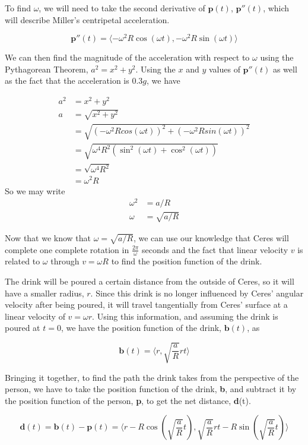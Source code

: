 \documentclass{amsart}
\renewcommand{\vec}{\textbf}
\theoremstyle{definition}
\begin{document}
To find $\omega$, we will need to take the second derivative of $\vec{p}(t)$, $\vec{p}''(t)$, which will describe Miller's centripetal acceleration.

\[
\vec{p}''(t) = \langle -\omega^2 R \cos(\omega t), - \omega^2 R \sin(\omega t)\rangle
\]

We can then find the magnitude of the acceleration with respect to $\omega$ using the Pythagorean Theorem, $a^2 = x^2 + y^2$. Using the $x$ and $y$ values of $\vec{p}''(t)$ as well as the fact that the acceleration is $0.3g$, we have

\begin{align*}
    a^2 &= x^2 + y^2 \\
    a &= \sqrt{x^2 + y^2} \\
    &= \sqrt{(-\omega^2 R cos(\omega t))^2 + (- \omega^2 R sin(\omega t))^2} \\
    &= \sqrt{\omega^4 R^2 (\sin^2(\omega t) + \cos^2(\omega t))} \\
    &= \sqrt{\omega^4 R^2} \\
    &= \omega^2 R
    \end{align*}
    So we may write
\begin{align*}
    \omega^2 &= a / R\\
    \omega &= \sqrt{a/R}
\end{align*}

Now that we know that $\omega = \sqrt{a/R}$, we can use our knowledge
that Ceres will complete one complete rotation in
$\frac{2\pi}{\omega}$ seconds and the fact that linear velocity $v$ is
related to $\omega$ through $v = \omega R$ to find the position
function of the drink.

The drink will be poured a certain distance from the outside of Ceres,
so it will have a smaller radius, \(r\). Since this drink is no longer
influenced by Ceres' angular velocity after being poured, it will
travel tangentially from Ceres' surface at a linear velocity of \(v =
\omega r\). Using this information, and assuming the drink is poured
at $t = 0$, we have the position function of the drink, $\vec{b}(t)$,
as

\[
\vec{b}(t) = \langle r, \sqrt{\frac{a}{R}}rt\rangle
\]

Bringing it together, to find the path the drink takes from the
perspective of the person, we have to take the position function of
the drink, \vec{b}, and subtract it by the position function of the
person, \vec{p}, to get the net distance, \vec{d}(t).

\[
\vec{d}(t) = \vec{b}(t) - \vec{p}(t) = \langle r - R\cos(\sqrt{\frac{a}{R}} t), \sqrt{\frac{a}{R}}rt - R \sin(\sqrt{\frac{a}{R}} t)\rangle
\]
\end{document}
